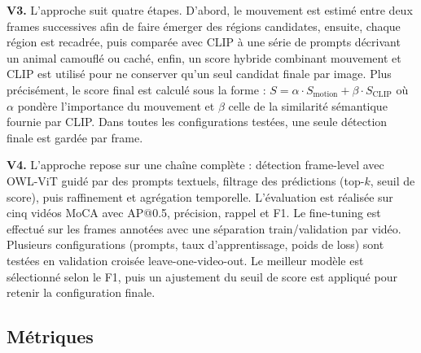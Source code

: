 \documentclass{article}
\begin{document}
\textbf{V3.}
L’approche suit quatre étapes. D’abord, le mouvement est estimé entre deux frames successives afin de faire émerger des régions candidates, ensuite, chaque région est recadrée, puis comparée avec CLIP à une série de prompts décrivant un animal camouflé ou caché, enfin, un score hybride combinant mouvement et CLIP est utilisé pour ne conserver qu’un seul candidat finale par image. Plus précisément, le score final est calculé sous la forme : $S = \alpha \cdot S_{\text{motion}} + \beta \cdot S_{\text{CLIP}}$
où $\alpha$ pondère l’importance du mouvement et $\beta$ celle de la similarité sémantique fournie par CLIP. Dans toutes les configurations testées, une seule détection finale est gardée par frame.

\textbf{V4.}
L’approche repose sur une chaîne complète : détection frame-level avec OWL-ViT guidé par des prompts textuels, filtrage des prédictions (top-$k$, seuil de score), puis raffinement et agrégation temporelle. L’évaluation est réalisée sur cinq vidéos MoCA avec AP@0.5, précision, rappel et F1. Le fine-tuning est effectué sur les frames annotées avec une séparation train/validation par vidéo. Plusieurs configurations (prompts, taux d’apprentissage, poids de loss) sont testées en validation croisée leave-one-video-out. Le meilleur modèle est sélectionné selon le F1, puis un ajustement du seuil de score est appliqué pour retenir la configuration finale.





\subsection{Métriques}
\end{document}
